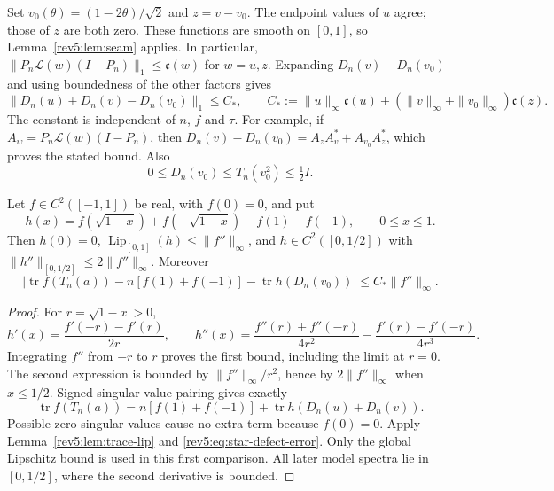 Set $v_0(\theta)=(1-2\theta)/\sqrt2$ and $z=v-v_0$.  The endpoint
values of $u$ agree; those of $z$ are both zero.  These functions are
smooth on $[0,1]$, so Lemma~\ref{rev5:lem:seam} applies.  In particular,
$\|P_n\mathcal L(w)(I-P_n)\|_1\leq\mathfrak c(w)$ for $w=u,z$.
Expanding $D_n(v)-D_n(v_0)$ and using boundedness of the other factors
gives
\begin{equation}\label{rev5:eq:star-defect-error}
 \|D_n(u)+D_n(v)-D_n(v_0)\|_1\leq C_*,\qquad
 C_*:=\|u\|_\infty\mathfrak c(u)
       +(\|v\|_\infty+\|v_0\|_\infty)\mathfrak c(z).
\end{equation}
The constant is independent of $n$, $f$ and $\tau$.
For example, if $A_w=P_n\mathcal L(w)(I-P_n)$, then
$D_n(v)-D_n(v_0)=A_zA_v^*+A_{v_0}A_z^*$, which proves the stated bound.
Also
\begin{equation}\label{rev5:eq:half-bound}
 0\leq D_n(v_0)\leq T_n(v_0^2)\leq\tfrac12 I.
\end{equation}

\begin{lemma}\label{rev5:lem:paired-test}
Let $f\in C^2([-1,1])$ be real, with $f(0)=0$, and put
\begin{equation}\label{rev5:eq:h}
 h(x)=f(\sqrt{1-x})+f(-\sqrt{1-x})-f(1)-f(-1),\qquad 0\leq x\leq1.
\end{equation}
Then $h(0)=0$, $\operatorname{Lip}_{[0,1]}(h)\leq\|f''\|_\infty$,
and $h\in C^2([0,1/2])$ with
$\|h''\|_{[0,1/2]}\leq2\|f''\|_\infty$.
Moreover
\begin{equation}\label{rev5:eq:paired-trace}
 \left|\operatorname{tr}f(T_n(a))-n[f(1)+f(-1)]
                    -\operatorname{tr}h(D_n(v_0))\right|
 \leq C_*\|f''\|_\infty.
\end{equation}
\end{lemma}

\begin{proof}
For $r=\sqrt{1-x}>0$,
\[
 h'(x)=\frac{f'(-r)-f'(r)}{2r},\qquad
 h''(x)=\frac{f''(r)+f''(-r)}{4r^2}
          -\frac{f'(r)-f'(-r)}{4r^3}.
\]
Integrating $f''$ from $-r$ to $r$ proves the first bound, including
the limit at $r=0$.  The second expression is bounded by
$\|f''\|_\infty/r^2$, hence by $2\|f''\|_\infty$ when $x\leq1/2$.
Signed singular-value pairing gives exactly
\[
 \operatorname{tr}f(T_n(a))
 =n[f(1)+f(-1)]+\operatorname{tr}h(D_n(u)+D_n(v)).
\]
Possible zero singular values cause no extra term because $f(0)=0$.
Apply Lemma~\ref{rev5:lem:trace-lip} and
\eqref{rev5:eq:star-defect-error}.  Only the global Lipschitz bound
is used in this first comparison.  All later model spectra lie in
$[0,1/2]$, where the second derivative is bounded.
\end{proof}

